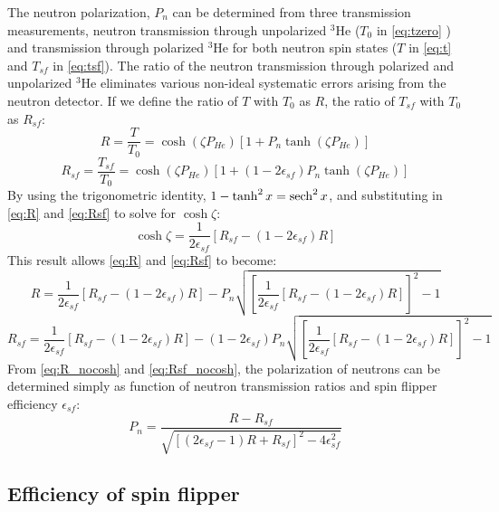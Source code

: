 The neutron polarization, $P_n$ can be determined from three transmission measurements, neutron transmission through unpolarized $^3$He ($T_0$ in \cref{eq:tzero} ) and transmission through polarized $^3$He for both neutron spin states ($T$ in \cref{eq:t} and $T_{sf}$ in \cref{eq:tsf}). The ratio of the neutron transmission through polarized and unpolarized $^3$He eliminates various non-ideal systematic errors arising from the neutron detector. If we define the ratio of $T$ with $T_0$ as $R$, the ratio of $T_{sf}$ with $T_0$ as $R_{sf}$:
\begin{equation}\label{eq:R}
    R = \frac{T}{T_0} = \cosh{\left(\zeta P_{He}\right)}\left[1+P_n\tanh{\left(\zeta P_{He}\right)}\right]
\end{equation}
\begin{equation}\label{eq:Rsf}
    R_{sf} = \frac{T_{sf}}{T_0} = \cosh{\left(\zeta P_{He}\right)}\left[1+\left(1-2\epsilon_{sf}\right)P_n\tanh{\left(\zeta P_{He}\right)}\right]
\end{equation}
By using the trigonometric identity, $1 - \tanh^2{x} = \operatorname{sech}^2{x}$, and substituting in \cref{eq:R} and \cref{eq:Rsf} to solve for $\cosh{\zeta}$:
\begin{equation}
    \cosh{\zeta} = \frac{1}{2\epsilon_{sf}}\left[R_{sf}-(1-2\epsilon_{sf})R\right]
\end{equation}
This result allows \cref{eq:R} and \cref{eq:Rsf} to become:
\begin{equation}\label{eq:R_nocosh}
    R = \frac{1}{2\epsilon_{sf}}\left[R_{sf}-(1-2\epsilon_{sf})R\right] - P_n\sqrt{\left[\frac{1}{2\epsilon_{sf}}\left[R_{sf}-\left(1-2\epsilon_{sf}\right)R\right]\right]^2 -1}
\end{equation}
\begin{equation}\label{eq:Rsf_nocosh}
    R_{sf} = \frac{1}{2\epsilon_{sf}}\left[R_{sf}-\left(1-2\epsilon_{sf}\right)R\right] - \left(1-2\epsilon_{sf}\right)P_n\sqrt{\left[\frac{1}{2\epsilon_{sf}}\left[R_{sf}-\left(1-2\epsilon_{sf}\right)R\right]\right]^2 -1}
\end{equation}
From \cref{eq:R_nocosh} and \cref{eq:Rsf_nocosh}, the polarization of neutrons can be determined simply as function of neutron transmission ratios and spin flipper efficiency $\epsilon_{sf}$:
\begin{equation} \label{eq:polarization}
P_n=\frac{R-R_{sf}}{\sqrt{\left[\left(2\epsilon_{sf}-1\right)R+R_{sf}\right]^{2}-4\epsilon_{sf}^2}}
\end{equation}

\subsection{Efficiency of spin flipper}

